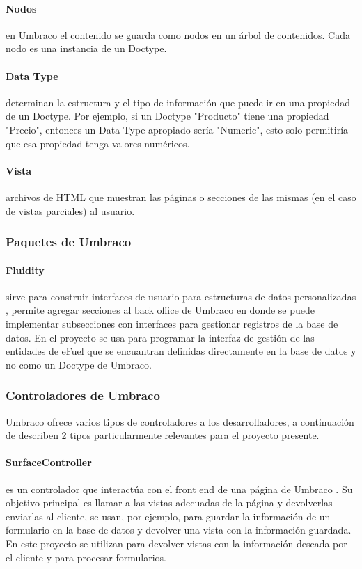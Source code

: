     \paragraph{Nodos} en Umbraco el contenido se guarda como nodos en un árbol de contenidos. Cada nodo es una instancia de un Doctype.
    \paragraph{Data Type} determinan la estructura y el tipo de información que puede ir en una propiedad de un Doctype. Por ejemplo, si un Doctype "Producto" tiene una propiedad "Precio", entonces un Data Type apropiado sería "Numeric", esto solo permitiría que esa propiedad tenga valores numéricos.
    \paragraph{Vista} \label{umbracoView} archivos de HTML que muestran las páginas o secciones de las mismas (en el caso de vistas parciales) al usuario.

    \subsubsection{Paquetes de Umbraco}
    \paragraph{Fluidity} sirve para construir interfaces de usuario para estructuras de datos personalizadas \cite{fluidityDocs}, permite agregar secciones al back office de Umbraco en donde se puede implementar subsecciones con interfaces para gestionar registros de la base de datos. En el proyecto se usa para programar la interfaz de gestión de las entidades de eFuel que se encuantran definidas directamente en la base de datos y no como un Doctype de Umbraco.

    \subsubsection{Controladores de Umbraco}
    Umbraco ofrece varios tipos de controladores a los desarrolladores, a continuación de describen 2 tipos particularmente relevantes para el proyecto presente.
    \paragraph{SurfaceController} es un controlador que interactúa con el front end de una página de Umbraco \cite{surfaceController}. Su objetivo principal es llamar a las vistas adecuadas de la página y devolverlas enviarlas al cliente, se usan, por ejemplo, para guardar la información de un formulario en la base de datos y devolver una vista con la información guardada. En este proyecto se utilizan para devolver vistas con la información deseada por el cliente y para procesar formularios.
